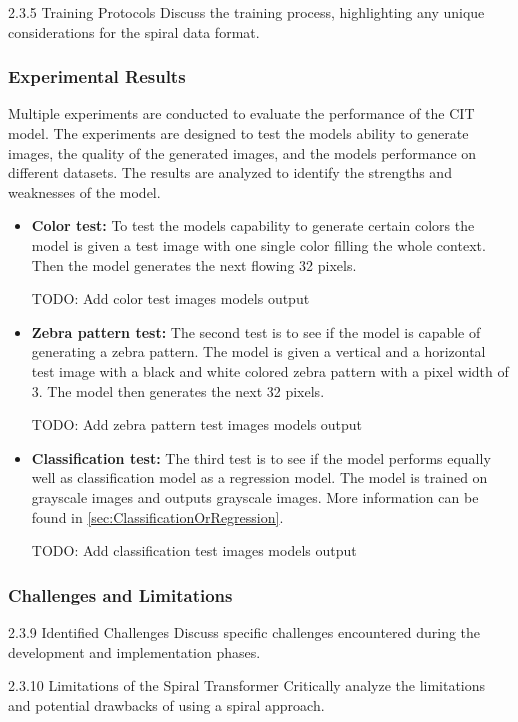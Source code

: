     

    2.3.5 Training Protocols
    Discuss the training process, highlighting any unique considerations for the spiral data format.

    \subsubsection{Experimental Results}
    
    Multiple experiments are conducted to evaluate the performance of the CIT model. The experiments are designed to test the models ability to generate images, the quality of the generated images, and the models performance on different datasets. The results are analyzed to identify the strengths and weaknesses of the model.

    \begin{itemize}
        \item \textbf{Color test:} To test the models capability to generate certain colors the model is given a test image with one single color filling the whole context. Then the model generates the next flowing 32 pixels. 
        
        TODO: Add color test images models output

        \item \textbf{Zebra pattern test:} The second test is to see if the model is capable of generating a zebra pattern. The model is given a vertical and a horizontal test image with a black and white colored zebra pattern with a pixel width of 3. The model then generates the next 32 pixels.
        
        TODO: Add zebra pattern test images models output
        

        \item \textbf{Classification test:} The third test is to see if the model performs equally well as classification model as a regression model. The model is trained on grayscale images and outputs grayscale images. More information can be found in \autoref{sec:ClassificationOrRegression}.
        
        TODO: Add classification test images models output
        

    \end{itemize}

    \subsubsection{Challenges and Limitations}
    2.3.9 Identified Challenges
    Discuss specific challenges encountered during the development and implementation phases.

    2.3.10 Limitations of the Spiral Transformer
    Critically analyze the limitations and potential drawbacks of using a spiral approach.
